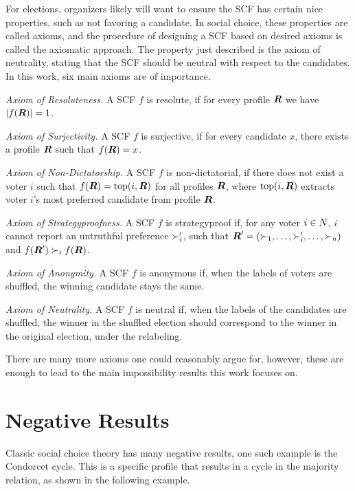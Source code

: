 For elections, organizers likely will want to ensure the SCF has certain
nice properties, such as not favoring a candidate. In social choice, these
properties are called axioms, and the procedure of designing a SCF based on
desired axioms is called the axiomatic approach. The property just
described is the axiom of neutrality, stating that the SCF should be
neutral with respect to the candidates. In this work, six main axioms are of
importance.

\emph{Axiom of Resoluteness.} A SCF $f$ is resolute, if for every profile
$\boldsymbol{R}$ we have $|f(\boldsymbol{R})| = 1$.

\emph{Axiom of Surjectivity.} A SCF $f$ is surjective, if for every candidate
$x$, there exists a profile $\boldsymbol{R}$ such that
$f(\boldsymbol{R}) = x$.

\emph{Axiom of Non-Dictatorship.} A SCF $f$ is non-dictatorial, if there does not exist a voter $i$ such that $f(\boldsymbol{R}) = \textnormal{top}(i,\boldsymbol{R})$ for all profiles $\boldsymbol{R}$, where $\textnormal{top}(i,\boldsymbol{R})$  extracts voter $i$'s most preferred candidate from profile $\boldsymbol{R}$.

\emph{Axiom of Strategyproofness.} A SCF $f$ is strategyproof if, for any
voter $i \in N$, $i$ cannot report an untruthful preference
$\succ_i'$, such that  $\boldsymbol{R}' = (\succ_{1}, \dots,
	\succ_{i}', \dots, \succ_{n})$ and $f(\boldsymbol{R}') \succ_i
	f(\boldsymbol{R})$.

\emph{Axiom of Anonymity.} A SCF $f$ is anonymous if, when the labels of voters
are shuffled, the winning candidate stays the same.

\emph{Axiom of Neutrality.} A SCF $f$ is neutral if, when the labels of the
candidates are shuffled, the winner in the shuffled election should correspond
to the winner in the original election, under the relabeling.

There are many more axioms one could reasonably argue for, however, these are
enough to lead to the main impossibility results this work focuses on.

\section{Negative Results}
\label{preliminaries: negative results}

Classic social choice theory has many negative results, one such example is the
Condorcet cycle. This is a specific profile that results in a cycle in the
majority relation, as shown in the following example.

